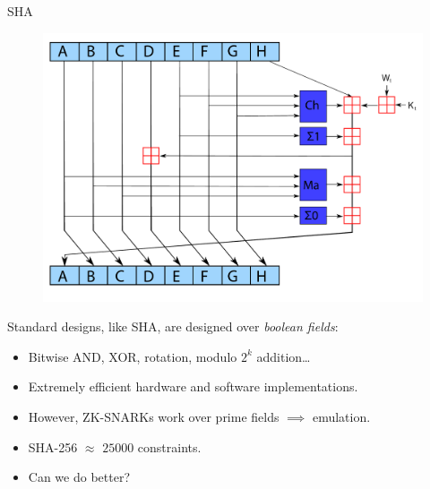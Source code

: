 \documentclass[beamer={10pt,xcolor=dvipsnames},target=mst]{thud}
\begin{document}
\begin{frame}{SHA~\cite{Dang2015}}
  \begin{figure}
    \centering
    \includegraphics[scale=0.175]{res/SHA-2.pdf}
  \end{figure}
  Standard designs, like SHA, are designed over \emph{boolean fields}:
  \begin{itemize}
    \item Bitwise AND, XOR, rotation, modulo \(2^{k}\) addition\dots
    \item Extremely efficient hardware and software implementations.
    \item However, ZK-SNARKs work over prime fields \(\implies \) emulation.
    \item SHA-256 \(\approx \) \(25000\) constraints.
    \item Can we do better?
  \end{itemize}
\end{frame}
\end{document}
